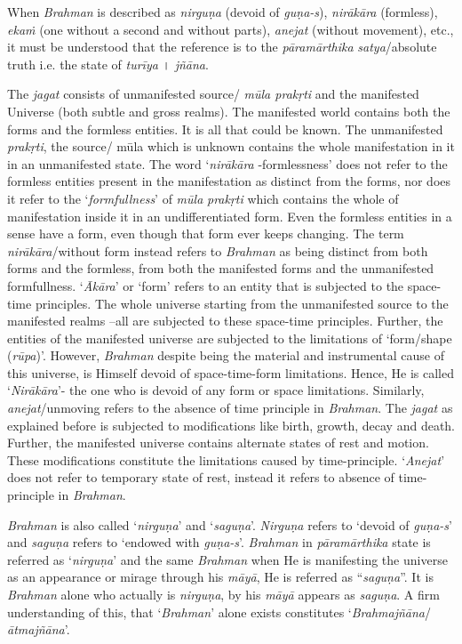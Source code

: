 When \emph{Brahman} is described as \emph{nirguṇa} (devoid of \emph{guṇa-s}), \emph{nirākāra} (formless), \emph{ekaṁ} (one without a second and without parts), \emph{anejat} (without movement), etc., it must be understood that the reference is to the \emph{pāramārthika} \emph{satya}/absolute truth i.e. the state of \emph{turīya} । \emph{jñāna}.

The \emph{jagat} consists of unmanifested source/ \emph{mūla prakṛti} and the manifested Universe (both subtle and gross realms). The manifested world contains both the forms and the formless entities. It is all that could be known. The unmanifested \emph{prakṛti}, the source/ mūla which is unknown contains the whole manifestation in it in an unmanifested state. The word `\emph{nirākāra} -formlessness' does not refer to the formless entities present in the manifestation as distinct from the forms, nor does it refer to the `\emph{formfullness}' of \emph{mūla} \emph{prakṛti} which contains the whole of manifestation inside it in an undifferentiated form. Even the formless entities in a sense have a form, even though that form ever keeps changing. The term \emph{nirākāra}/without form instead refers to \emph{Brahman} as being distinct from both forms and the formless, from both the manifested forms and the unmanifested formfullness. `\emph{Ākāra}' or `form' refers to an entity that is subjected to the space-time principles. The whole universe starting from the unmanifested source to the manifested realms --all are subjected to these space-time principles. Further, the entities of the manifested universe are subjected to the limitations of `form/shape (\emph{rūpa})'. However, \emph{Brahman} despite being the material and instrumental cause of this universe, is Himself devoid of space-time-form limitations. Hence, He is called `\emph{Nirākāra}'- the one who is devoid of any form or space limitations. Similarly, \emph{anejat}/unmoving refers to the absence of time principle in \emph{Brahman}. The \emph{jagat} as explained before is subjected to modifications like birth, growth, decay and death. Further, the manifested universe contains alternate states of rest and motion. These modifications constitute the limitations caused by time-principle. `\emph{Anejat}' does not refer to temporary state of rest, instead it refers to absence of time-principle in \emph{Brahman}.

\emph{Brahman} is also called `\emph{nirguṇa}' and `\emph{saguṇa}'. \emph{Nirguṇa} refers to `devoid of \emph{guṇa-s}' and \emph{saguṇa} refers to `endowed with \emph{guṇa-s}'. \emph{Brahman} in \emph{pāramārthika} state is referred as `\emph{nirguṇa}' and the same \emph{Brahman} when He is manifesting the universe as an appearance or mirage through his \emph{māyā}, He is referred as ``\emph{saguṇa}''. It is \emph{Brahman} alone who actually is \emph{nirguṇa}, by his \emph{māyā} appears as \emph{saguṇa}. A firm understanding of this, that `\emph{Brahman}' alone exists constitutes `\emph{Brahmajñāna}/\emph{ātmajñāna}'.

